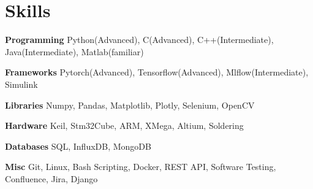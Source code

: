 
\section{Skills}
  \vspace{2pt}
  \resumeSubHeadingListStart
    \small{\item{

    \textbf{\color{MidnightBlue}Programming}{ Python(Advanced), C(Advanced), C++(Intermediate), Java(Intermediate), Matlab(familiar)} \\ \vspace{3pt}

    \textbf{\color{MidnightBlue}Frameworks}{ Pytorch(Advanced), Tensorflow(Advanced), Mlflow(Intermediate)}, Simulink \\ \vspace{3pt}

    \textbf{\color{MidnightBlue}Libraries}{ Numpy, Pandas, Matplotlib, Plotly, Selenium, OpenCV} \\ \vspace{3pt}

    \textbf{\color{MidnightBlue}Hardware}{ Keil, Stm32Cube, ARM, XMega, Altium, Soldering} \\ \vspace{3pt}

    \textbf{\color{MidnightBlue}Databases}{ SQL, InfluxDB, MongoDB} \\ \vspace{3pt}

    \textbf{\color{MidnightBlue}Misc}{ Git, Linux, Bash Scripting, Docker, REST API, Software Testing, Confluence, Jira, Django} \\ \vspace{3pt}
            
    }}
  \resumeSubHeadingListEnd

